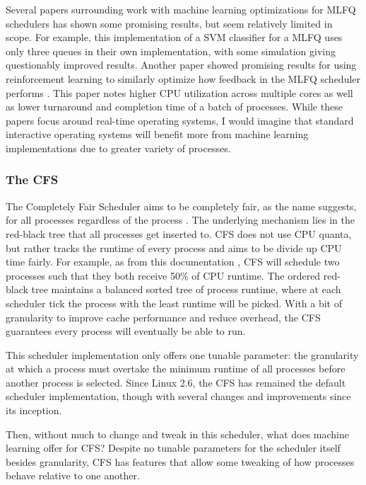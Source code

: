 \documentclass[12pt]{article}
\def\ind{\hspace*{0.3in}}
\begin{document}
Several papers surrounding work with machine learning optimizations for MLFQ schedulers has shown some promising results, but seem relatively limited in scope. For example, this implementation of a SVM classifier for a MLFQ \cite{satyanarayanaImprovedProcessScheduling2018} uses only three queues in their own implementation, with some simulation giving questionably improved results. Another paper showed promising results for using reinforcement learning to similarly optimize how feedback in the MLFQ scheduler performs \cite{rinkuReinforcementLearningBased2020}. This paper notes higher CPU utilization across multiple cores as well as lower turnaround and completion time of a batch of processes. While these papers focus around real-time operating systems, I would imagine that standard interactive operating systems will benefit more from machine learning implementations due to greater variety of processes. 

\subsubsection*{The CFS}

\ind The Completely Fair Scheduler aims to be completely fair, as the name suggests, for all processes regardless of the process \cite{DocumentationSchedulerScheddesignCFS}. The underlying mechanism lies in the red-black tree that all processes get inserted to. CFS does not use CPU quanta, but rather tracks the runtime of every process and aims to be divide up CPU time fairly. For example, as from this documentation \cite{DocumentationSchedulerScheddesignCFS}, CFS will schedule two processes such that they both receive 50\% of CPU runtime. The ordered red-black tree maintains a balanced sorted tree of process runtime, where at each scheduler tick the process with the least runtime will be picked. With a bit of granularity to improve cache performance and reduce overhead, the CFS guarantees every process will eventually be able to run.

This scheduler implementation only offers one tunable parameter: the granularity at which a process must overtake the minimum runtime of all processes before another process is selected. Since Linux 2.6, the CFS has remained the default scheduler implementation, though with several changes and improvements since its inception. 

Then, without much to change and tweak in this scheduler, what does machine learning offer for CFS? Despite no tunable parameters for the scheduler itself besides granularity, CFS has features that allow some tweaking of how processes behave relative to one another. 
\end{document}

